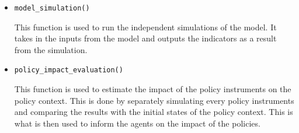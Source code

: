 \begin{itemize}
\item \texttt{model\_simulation()}

This function is used to run the independent simulations of the model. It takes in the inputs from the model and outputs the indicators as a result from the simulation.

\item \texttt{policy\_impact\_evaluation()}

This function is used to estimate the impact of the policy instruments on the policy context. This is done by separately simulating every policy instruments and comparing the results with the initial states of the policy context. This is what is then used to inform the agents on the impact of the policies.

\end{itemize}



